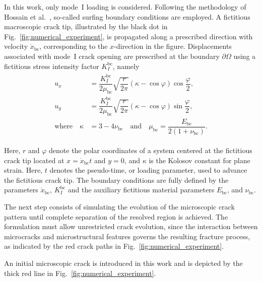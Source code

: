 \documentclass[pdflatex,sn-mathphys-num]{sn-jnl}%
\theoremstyle{thmstyleone}%
\theoremstyle{thmstyletwo}%
\theoremstyle{thmstylethree}%
\begin{document}
In this work, only mode~I loading is considered.
Following the methodology of Hossain et al.~\cite{hossain_effective_2014}, so-called surfing boundary conditions are employed.
A fictitious macroscopic crack tip, illustrated by the black dot in Fig.~\ref{fig:numerical_experiment}, is propagated along a prescribed direction with velocity $\dot{x}_{\text{bc}}$, 
corresponding to the $x$-direction in the figure.
Displacements associated with mode~I crack opening are prescribed at the boundary $\partial\Omega$ using a fictitious 
stress intensity factor $K_I^{\text{bc}}$, namely
\begin{align}
    \begin{split}
        u_x &= \dfrac{K_I^{\text{bc}}}{2\mu_{\text{bc}}}  \sqrt{\dfrac{r}{2\pi}}\left(\kappa - \cos{\varphi}\right)\cos{\dfrac{\varphi}{2}},\\
        u_y &= \dfrac{K_I^{\text{bc}}}{2\mu_{\text{bc}}}  \sqrt{\dfrac{r}{2\pi}}\left(\kappa - \cos{\varphi}\right)\sin{\dfrac{\varphi}{2}},\\
        \text{where} \quad \kappa &= 3 - 4\nu_{\text{bc}} \quad \text{and} \quad \mu_{\text{bc}} = \dfrac{E_{\text{bc}}}{2\left(1 + \nu_{\text{bc}}\right)}.
        \label{eq:surfing-bcs}
    \end{split}
\end{align}

Here, $r$ and $\varphi$ denote the polar coordinates of a system centered at the fictitious 
crack tip located at $x = \dot{x}_{\text{bc}} t$ and $y = 0$, and $\kappa$ is the Kolosov constant for plane strain.
Here, $t$ denotes the pseudo-time, or loading parameter, used to advance the fictitious crack tip.
The boundary conditions are fully defined by the 
parameters $\dot{x}_{\text{bc}}$, $K_I^{\text{bc}}$ and the auxiliary fictitious material parameters  
$E_{\text{bc}}$, and $\nu_{\text{bc}}$.

The next step consists of simulating the evolution of the microscopic crack pattern until complete separation of the resolved region is achieved.
The formulation must allow unrestricted crack evolution, since the interaction between microcracks and microstructural features governs the resulting fracture process, as indicated by the red crack paths in Fig.~\ref{fig:numerical_experiment}.

An initial microscopic crack is introduced in this work and is depicted by the thick red line in Fig.~\ref{fig:numerical_experiment}.
\end{document}
